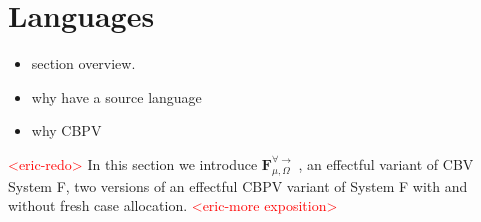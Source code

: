 \documentclass[acmsmall]{acmart}
\newcommand{\eric}[1]{\textcolor{red}{ <eric-#1> }}
\newcommand{\source}{$\mathbf{F}_{\mu,\Omega}^{\forall\to}\;$}
\begin{document}
\begin{comment}
\subsubsection{Gradual Typing with Fresh Quantification}

To illustrate this, we will consider a polymorphic Call-by-push-value \eric{cite} calculus with an extensible sum type denoted $OSum$ which we use to represent the dynamic type Dyn. In order to inject a value, $V:A$, into $OSum$, we need a $Case$ symbol associated with the type $A$. Case symbols are representative of the runtime type tags of the dynamic type and can be dynamically allocated by the expression $new_A : F(Case\;A)$. The introduction from of the extensible sum type, $inj_\sigma\;V : OSum$ uses a case symbol $\sigma : Case\;A$ to store a value $V:A$. The elimination form, $rec_{OSum}\;(inj_\sigma\;V),\sigma'\;\{x.\;M\;|\;N\}$, compares the case symbol $\sigma$ used to inject the value into $OSum$ to a given case symbol $\sigma'$. When the case symbols match, the value stored in $OSum$ is bound to $x$ in the continuation $M$. Otherwise, we proceed with the default case $N$. Assuming a preallocated set of case symbols $\sigma_\mathbb{B} : Case\;\mathbb{B},\sigma_\times : Case\;(OSum \times OSum),\sigma_\to : Case\;(OSum \to OSum),...$, we can encode the example above as:
$$t : \forall X.Case\;X \to X \to F\mathbb{B} := \Lambda X. \lambda \sigma_X.\lambda x.rec_{OSum}\;(inj_{\sigma_X}x),\sigma_\mathbb{B}\;\{x.\;ret\;x\;|\;\Omega\}$$
\\
\\
\end{comment}




\section{Languages}\label{sec:Languages}
\begin{itemize}
  \item section overview.
  \item why have a source language
  \item why CBPV
\end{itemize}
\eric{redo}
In this section we introduce \source, an effectful variant of CBV System F, two versions of an effectful CBPV variant of System F with and without fresh case allocation. \eric{more exposition}
\end{document}
